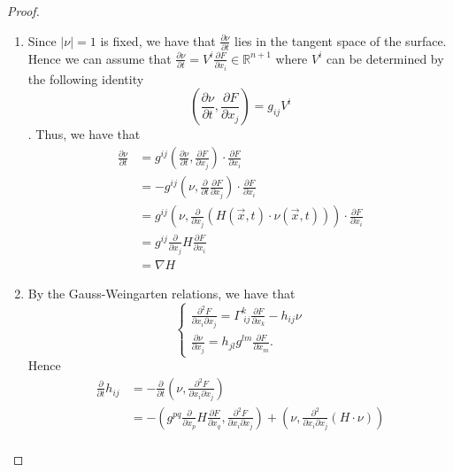 \documentclass[a4paper]{report}
\newcommand{\R}{\mathbb{R}}
\theoremstyle{remark}
\begin{document}
\begin{proof}
\begin{enumerate}
		\item Since $\left| \nu \right| =1$ is fixed, we have that $\frac{\partial \nu }{\partial t} $ lies in the tangent space of the surface. Hence we can assume that $\frac{\partial \nu }{\partial t} = V^i \frac{\partial F}{\partial x_{i}} \in \R^{n+1}$ where $V^i$ can be determined by the following identity \[\left( \frac{\partial \nu }{\partial t} ,\frac{\partial F}{\partial x_{j}}  \right) = g_{ij}^{} V^i\]. Thus, we have that
		      \begin{equation*}
			      \begin{split}
				      \frac{\partial \nu }{\partial t} &=g_{}^{ij} \left( \frac{\partial \nu }{\partial t} ,\frac{\partial F}{\partial x_{j}}  \right) \cdot \frac{\partial F}{\partial x_{i}} \\
				      &= -g_{}^{ij} \left( \nu  ,\frac{\partial }{\partial t} \frac{\partial F}{\partial x_{j}}  \right) \cdot \frac{\partial F}{\partial x_{i}} \\
				      &= g_{}^{ij} \left( \nu  , \frac{\partial }{\partial x_{j}} (H (\vec{x},t) \cdot \nu (\vec{x},t) ) \right) \cdot \frac{\partial F}{\partial x_{i}} \\
				      &= g_{}^{ij} \frac{\partial }{\partial x_{j}} H \frac{\partial F}{\partial x_{i}} \\
				      &=\nabla H
			      \end{split}
		      \end{equation*}
		\item By the Gauss-Weingarten relations, we have that
		      \[
			      \begin{cases}
				      \frac{\partial ^2 F}{\partial x_{i} \partial x_{j}} = \Gamma_{\ ij}^{k} \frac{\partial F}{\partial x_{k}} -h_{ij}^{} \nu \\
				      \frac{\partial \nu }{\partial x_{j}} =h_{jl}^{} g_{}^{lm } \frac{\partial F}{\partial x_{m}} .
			      \end{cases}
		      \]
		      Hence
		      \begin{equation*}
			      \begin{split}
				      \frac{\partial }{\partial t} h_{ij}^{}  &= -\frac{\partial }{\partial t} \left( \nu , \frac{\partial^2 F}{\partial x_{i} \partial x_{j}} \right)  \\
				      &= -\left( g_{}^{pq } \frac{\partial }{\partial x_{p}} H \frac{\partial F}{\partial x_{q}} , \frac{\partial^2 F}{\partial x_{i} \partial x_{j}}  \right) + \left( \nu , \frac{\partial^2 }{\partial x_{i} \partial x_{j}} (H \cdot \nu ) \right) \\

\end{split}
\end{equation*}
\end{enumerate}
\end{proof}
\end{document}
